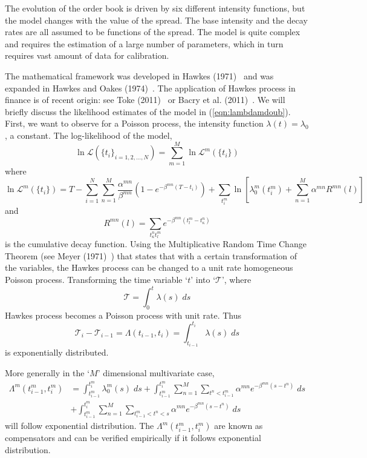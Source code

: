 The evolution of the order book is driven by six different intensity functions, but the model changes with the value of the spread. The base intensity and the decay rates are all assumed to be functions of the spread. The model is quite complex and requires the estimation of a large number of parameters, which in turn requires vast amount of data for calibration. 


The mathematical framework was developed in Hawkes (1971)~\cite{} and was expanded in Hawkes and Oakes (1974)~\cite{}. The application of Hawkes process in finance is of recent origin: see Toke (2011)~\cite{} or Bacry et al. (2011)~\cite{}. We will briefly discuss the likelihood estimates of the model in (\ref{eqn:lambdamdoub}). First, we want to observe for a Poisson process, the intensity function $\lambda(t)=\lambda_0$, a constant. The log-likelihood of the model,
	\begin{equation}\label{eqn:loglikemod}
	\ln \mathcal{L}(\{t_i\}_{i=1,2,\ldots,N}) = \sum_{m=1}^M \ln \mathcal{L}^m(\{t_i\})
	\end{equation}
where
	\[
	\ln \mathcal{L}^m(\{t_i\})= T - \sum_{i=1}^N \sum_{n=1}^M \dfrac{\alpha^{mn}}{\beta^{mn}} (1- e^{-\beta^{mn}(T-t_i)}) + \sum_{t_i^m} \ln[ \lambda_0^m(t_i^m) + \sum_{n=1}^M \alpha^{mn} R^{mn}(l) ]
	\]
and 
	\[
	R^{mn}(l)= \sum_{t_\kappa^n t_l^m} e^{-\beta^{mn}(t_l^m-t_\kappa^n)}
	\]
is the cumulative decay function. Using the Multiplicative Random Time Change Theorem (see Meyer (1971)~\cite{}) that states that with a certain transformation of the variables, the Hawkes process can be changed to a unit rate homogeneous Poisson process. Transforming the time variable `$t$' into `$\mathcal{T}$', where
	\begin{equation}\label{eqn:calt}
	\mathcal{T}= \int_0^t \lambda(s) \; ds
	\end{equation}
Hawkes process becomes a Poisson process with unit rate. Thus
	\begin{equation}\label{eqn:diffcalt}
	\mathcal{T}_i - \mathcal{T}_{i-1}= \Lambda(t_{i-1},t_i) = \int_{t_{i-1}}^{t_i} \lambda(s) \; ds
	\end{equation}
is exponentially distributed. 


More generally in the `$M$' dimensional multivariate case,
	\[
	\begin{split}
	\Lambda^m(t_{i-1}^m,t_i^m)&= \int_{t_{i-1}^m}^{t_i^m} \lambda_0^m(s) \; ds + \int_{t_{i-1}^m}^{t_i^m} \sum_{n=1}^M \sum_{t^n<t_{i-1}^m} \alpha^{mn} e^{-\beta^{mn}(s-t^n)} \; ds \\
	&+ \int_{t_{i-1}^m}^{t_i^m} \sum_{n=1}^M \sum_{t_{i-1}^m<t^n<s} \alpha^{mn} e^{-\beta^{mn}(s-t^n)} \; ds
	\end{split}
	\]
will follow exponential distribution. The $\Lambda^m(t_{i-1}^m,t_i^m)$ are known as compensators and can be verified empirically if it follows exponential distribution. 


